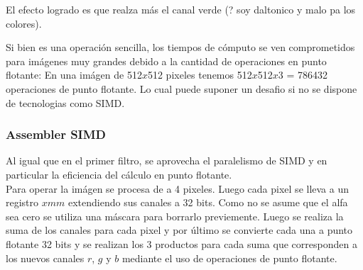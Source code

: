 El efecto logrado es que realza más el canal verde (? soy daltonico y malo pa los colores). 

\begin{figure}
  \centering
  \hfill
\end{figure}

Si bien es una operación sencilla, los tiempos de cómputo se ven comprometidos para imágenes muy grandes debido a la cantidad de operaciones en punto flotante: En una imágen de 512$x$512 pixeles tenemos 512$x$512$x$3 = 786432 operaciones de punto flotante. Lo cual puede suponer un desafio si no se dispone de tecnologias como SIMD.

\subsubsection{Assembler SIMD}

Al igual que en el primer filtro, se aprovecha el paralelismo de SIMD y en particular la eficiencia del cálculo en punto flotante.\\

Para operar la imágen se procesa de a 4 pixeles. Luego cada pixel se lleva a un registro $xmm$ extendiendo sus canales a 32 bits. Como no se asume que el alfa sea cero se utiliza una máscara para borrarlo previemente. Luego se realiza la suma de los canales para cada pixel y por último se convierte cada una a punto flotante 32 bits y se realizan los 3 productos para cada suma que corresponden a los nuevos canales $r$, $g$ y $b$ mediante el uso de operaciones de punto flotante.\\

